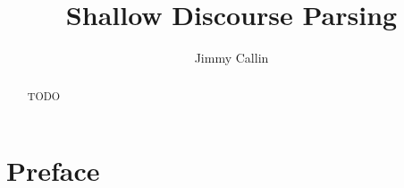 \documentclass[master,times]{stpthesis}
\begin{document}
\author{Jimmy Callin}
\title{Shallow Discourse Parsing}

\maketitle
\frontmatter*

\begin{abstract}
  TODO
\end{abstract}

\clearpage
\tableofcontents*

\chapter{Preface}

\mainmatter*





% 
\end{document}
